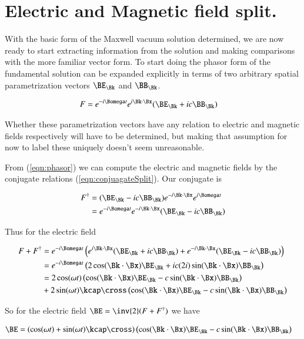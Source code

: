 \section{Electric and Magnetic field split.}

With the basic form of the Maxwell vacuum solution determined, we are now ready to start extracting information from the solution and making comparisons with the more familiar vector form.  To start doing the phasor form of the fundamental solution can be expanded explicitly in terms of two arbitrary spatial parametrization vectors $\BE_\Bk$ and $\BB_\Bk$.

\begin{align}\label{eqn:phasor}
F &= e^{-i\Bomega t} e^{i \Bk \cdot \Bx} (\BE_\Bk + i c \BB_\Bk)
\end{align}

Whether these parametrization vectors have any relation to electric and magnetic fields respectively will have to be determined, but making that assumption for now to label these uniquely doesn't seem unreasonable.

From (\ref{eqn:phasor}) we can compute the electric and magnetic fields by the conjugate relations (\ref{eqn:conjuagateSplit}).  Our conjugate is

\begin{align*}
F^\dagger
&= (\BE_\Bk - i c \BB_\Bk) e^{-i \Bk \cdot \Bx} e^{i\Bomega t} \\
&=
e^{-i\Bomega t}
e^{-i \Bk \cdot \Bx}
(\BE_\Bk - i c \BB_\Bk)
\end{align*}

Thus for the electric field

\begin{align*}
F + F^\dagger
&=
e^{-i\Bomega t} \left(
 e^{i \Bk \cdot \Bx} (\BE_\Bk + i c \BB_\Bk)
+e^{-i \Bk \cdot \Bx} (\BE_\Bk - i c \BB_\Bk)
\right) \\
&=
e^{-i\Bomega t} \left(
 2 \cos(\Bk \cdot \Bx) \BE_\Bk
+ i c (2 i) \sin(\Bk \cdot \Bx) \BB_\Bk
\right) \\
&=
2 \cos(\omega t) \left(
 \cos(\Bk \cdot \Bx) \BE_\Bk
- c \sin(\Bk \cdot \Bx) \BB_\Bk
\right) \\
&+ 2
\sin(\omega t)
\kcap \cross
\left(
 \cos(\Bk \cdot \Bx) \BE_\Bk
- c \sin(\Bk \cdot \Bx) \BB_\Bk
\right) \\
\end{align*}

So for the electric field $\BE = \inv{2}(F + F^\dagger)$ we have

\begin{align}\label{eqn:electricSplit}
\BE &=
\left( \cos(\omega t) + \sin(\omega t) \kcap \cross \right)
\left(
 \cos(\Bk \cdot \Bx) \BE_\Bk
- c \sin(\Bk \cdot \Bx) \BB_\Bk
\right)
\end{align}

